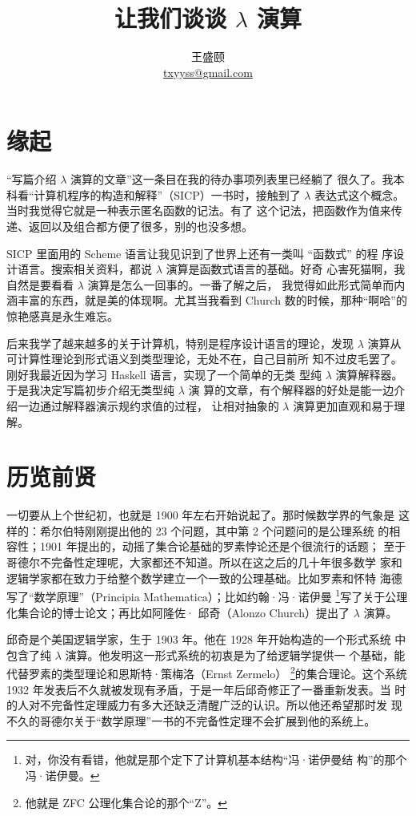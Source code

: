 \documentclass[a4paper,adobefonts]{ctexart}
\begin{document}
\title{{\bfseries 让我们谈谈 $\lambda$ 演算}}
\author{王盛颐\\\href{mailto:txyyss@gmail.com}{txyyss@gmail.com}}
\date{}
\maketitle

\section*{缘起}

``写篇介绍 $\lambda$ 演算的文章''这一条目在我的待办事项列表里已经躺了
很久了。我本科看``计算机程序的构造和解释''（SICP）一书时，接触到了
$\lambda$ 表达式这个概念。当时我觉得它就是一种表示匿名函数的记法。有了
这个记法，把函数作为值来传递、返回以及组合都方便了很多，别的也没多想。

SICP 里面用的 Scheme 语言让我见识到了世界上还有一类叫 ``函数式'' 的程
序设计语言。搜索相关资料，都说 $\lambda$ 演算是函数式语言的基础。好奇
心害死猫啊，我自然是要看看 $\lambda$ 演算是怎么一回事的。一番了解之后，
我觉得如此形式简单而内涵丰富的东西，就是美的体现啊。尤其当我看到
Church 数的时候，那种``啊哈''的惊艳感真是永生难忘。

后来我学了越来越多的关于计算机，特别是程序设计语言的理论，发现
$\lambda$ 演算从可计算性理论到形式语义到类型理论，无处不在，自己目前所
知不过皮毛罢了。刚好我最近因为学习 Haskell 语言，实现了一个简单的无类
型纯 $\lambda$ 演算解释器。于是我决定写篇初步介绍无类型纯 $\lambda$ 演
算的文章，有个解释器的好处是能一边介绍一边通过解释器演示规约求值的过程，
让相对抽象的 $\lambda$ 演算更加直观和易于理解。

\section{历览前贤}

一切要从上个世纪初，也就是 1900 年左右开始说起了。那时候数学界的气象是
这样的：希尔伯特刚刚提出他的 23 个问题，其中第 2 个问题问的是公理系统
的相容性；1901 年提出的，动摇了集合论基础的罗素悖论还是个很流行的话题；
至于哥德尔不完备性定理呢，大家都还不知道。所以在这之后的几十年很多数学
家和逻辑学家都在致力于给整个数学建立一个一致的公理基础。比如罗素和怀特
海德写了``数学原理''（Principia Mathematica）；比如约翰·冯·诺伊曼
\footnote{对，你没有看错，他就是那个定下了计算机基本结构``冯·诺伊曼结
  构''的那个冯·诺伊曼。}写了关于公理化集合论的博士论文；再比如阿隆佐·
邱奇（Alonzo Church）提出了 $\lambda$ 演算。

邱奇是个美国逻辑学家，生于 1903 年。他在 1928 年开始构造的一个形式系统
中包含了纯 $\lambda$ 演算。他发明这一形式系统的初衷是为了给逻辑学提供一
个基础，能代替罗素的类型理论和恩斯特·策梅洛（Ernst Zermelo）
\footnote{他就是 ZFC 公理化集合论的那个``Z''。}的集合理论。这个系统
1932 年发表后不久就被发现有矛盾，于是一年后邱奇修正了一番重新发表。当
时的人对不完备性定理威力有多大还缺乏清醒广泛的认识。所以他还希望那时发
现不久的哥德尔关于``数学原理''一书的不完备性定理不会扩展到他的系统上。
\end{document}
